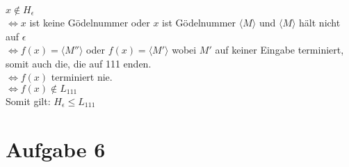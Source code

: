 \documentclass[a4paper,11pt]{scrartcl}
\begin{document}
	$x \not \in H_{\epsilon}$\\
				 $\Leftrightarrow x$ ist keine Gödelnummer oder $x$ ist Gödelnummer $\langle M \rangle$ und $\langle M \rangle$ hält nicht auf $\epsilon$\\
				 $\Leftrightarrow f(x) = \langle M'' \rangle$ oder $f(x) = \langle M' \rangle$ wobei $M'$ auf keiner Eingabe terminiert, somit auch die, die auf 111 enden.\\
				 $\Leftrightarrow f(x)$ terminiert nie.\\
				 $\Leftrightarrow f(x) \not \in L_{111}$\\

	Somit gilt: $H_{\epsilon} \leq L_{111}$
	
	\section*{Aufgabe 6}
\end{document}

